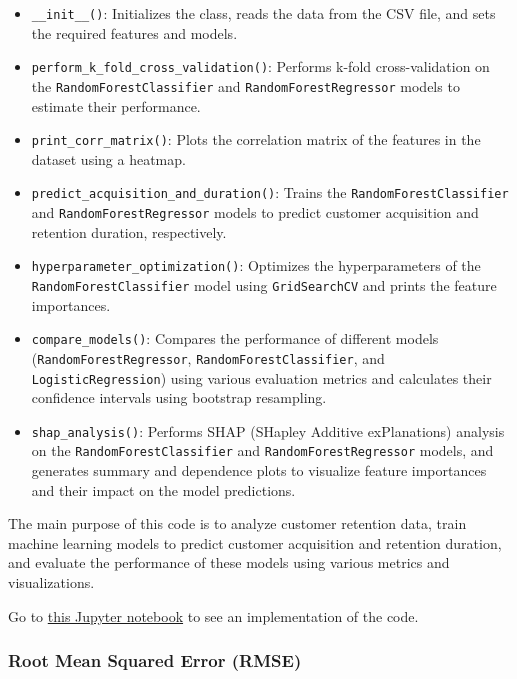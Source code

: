 \begin{itemize}
\item
  \texttt{\_\_init\_\_()}: Initializes the class, reads the data from
  the CSV file, and sets the required features and models.
\item
  \texttt{perform\_k\_fold\_cross\_validation()}: Performs k-fold
  cross-validation on the \texttt{RandomForestClassifier} and
  \texttt{RandomForestRegressor} models to estimate their performance.
\item
  \texttt{print\_corr\_matrix()}: Plots the correlation matrix of the
  features in the dataset using a heatmap.
\item
  \texttt{predict\_acquisition\_and\_duration()}: Trains the
  \texttt{RandomForestClassifier} and \texttt{RandomForestRegressor}
  models to predict customer acquisition and retention duration,
  respectively.
\item
  \texttt{hyperparameter\_optimization()}: Optimizes the hyperparameters
  of the \texttt{RandomForestClassifier} model using
  \texttt{GridSearchCV} and prints the feature importances.
\item
  \texttt{compare\_models()}: Compares the performance of different
  models (\texttt{RandomForestRegressor},
  \texttt{RandomForestClassifier}, and \texttt{LogisticRegression})
  using various evaluation metrics and calculates their confidence
  intervals using bootstrap resampling.
\item
  \texttt{shap\_analysis()}: Performs SHAP (SHapley Additive
  exPlanations) analysis on the \texttt{RandomForestClassifier} and
  \texttt{RandomForestRegressor} models, and generates summary and
  dependence plots to visualize feature importances and their impact on
  the model predictions.
\end{itemize}

The main purpose of this code is to analyze customer retention data,
train machine learning models to predict customer acquisition and
retention duration, and evaluate the performance of these models using
various metrics and visualizations.

Go to
\href{https://github.com/eriosta/analytics-applications/blob/main/customers/main.ipynb}{this
Jupyter notebook} to see an implementation of the code.

\hypertarget{root-mean-squared-error-rmse}{%
\subsubsection{Root Mean Squared Error
(RMSE)}\label{root-mean-squared-error-rmse}}

